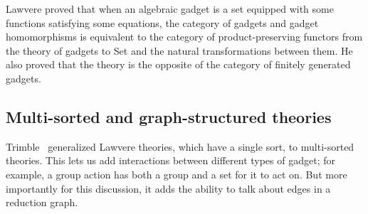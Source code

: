 \documentclass{article}
\begin{document}
Lawvere proved that when an algebraic gadget is a set equipped with some functions satisfying some equations, the category of gadgets and gadget homomorphisms is equivalent to the category of product-preserving functors from the theory of gadgets to Set and the natural transformations between them.  He also proved that the theory is the opposite of the category of finitely generated gadgets.

\subsection{Multi-sorted and graph-structured theories}

Trimble~\cite{Trimble2018} generalized Lawvere theories, which have a single sort, to multi-sorted theories.  This lets us add interactions between different types of gadget; for example, a group action has both a group and a set for it to act on.  But more importantly for this discussion, it adds the ability to talk about edges in a reduction graph.
\end{document}
